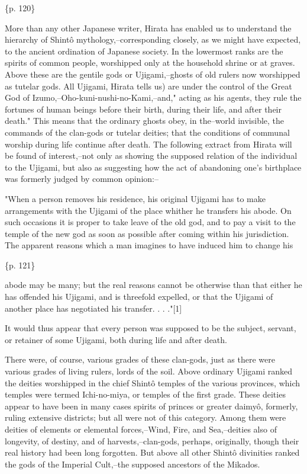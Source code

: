 \{p. 120\}

More than any other Japanese writer, Hirata has enabled us to understand the hierarchy of Shintô mythology,--corresponding closely, as we might have expected, to the ancient ordination of Japanese society. In the lowermost ranks are the spirits of common people, worshipped only at the household shrine or at graves. Above these are the gentile gods or Ujigami,--ghosts of old rulers now worshipped as tutelar gods. All Ujigami, Hirata tells us) are under the control of the Great God of Izumo,--Oho-kuni-nushi-no-Kami,--and," acting as his agents, they rule the fortunes of human beings before their birth, during their life, and after their death." This means that the ordinary ghosts obey, in the--world invisible, the commands of the clan-gods or tutelar deities; that the conditions of communal worship during life continue after death. The following extract from Hirata will be found of interest,--not only as showing the supposed relation of the individual to the Ujigami, but also as suggesting how the act of abandoning one's birthplace was formerly judged by common opinion:--

"When a person removes his residence, his original Ujigami has to make arrangements with the Ujigami of the place whither he transfers his abode. On such occasions it is proper to take leave of the old god, and to pay a visit to the temple of the new god as soon as possible after coming within his jurisdiction. The apparent reasons which a man imagines to have induced him to change his

\{p. 121\}

abode may be many; but the real reasons cannot be otherwise than that either he has offended his Ujigami, and is threefold expelled, or that the Ujigami of another place has negotiated his transfer. . . ."[1]

It would thus appear that every person was supposed to be the subject, servant, or retainer of some Ujigami, both during life and after death.

There were, of course, various grades of these clan-gods, just as there were various grades of living rulers, lords of the soil. Above ordinary Ujigami ranked the deities worshipped in the chief Shintô temples of the various provinces, which temples were termed Ichi-no-miya, or temples of the first grade. These deities appear to have been in many cases spirits of princes or greater daimyô, formerly, ruling extensive districts; but all were not of this category. Among them were deities of elements or elemental forces,--Wind, Fire, and Sea,--deities also of longevity, of destiny, and of harvests,--clan-gods, perhaps, originally, though their real history had been long forgotten. But above all other Shintô divinities ranked the gods of the Imperial Cult,--the supposed ancestors of the Mikados.

